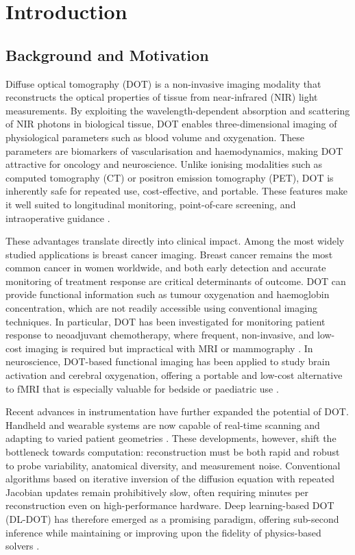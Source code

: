\chapter{Introduction}


\section{Background and Motivation}
Diffuse optical tomography (DOT) is a non-invasive imaging modality that reconstructs the optical properties of tissue from near-infrared (NIR) light measurements. By exploiting the wavelength-dependent absorption and scattering of NIR photons in biological tissue, DOT enables three-dimensional imaging of physiological parameters such as blood volume and oxygenation. These parameters are biomarkers of vascularisation and haemodynamics, making DOT attractive for oncology and neuroscience. Unlike ionising modalities such as computed tomography (CT) or positron emission tomography (PET), DOT is inherently safe for repeated use, cost-effective, and portable. These features make it well suited to longitudinal monitoring, point-of-care screening, and intraoperative guidance \cite{arridge1999, gibson2005}.

These advantages translate directly into clinical impact. Among the most widely studied applications is breast cancer imaging. Breast cancer remains the most common cancer in women worldwide, and both early detection and accurate monitoring of treatment response are critical determinants of outcome. DOT can provide functional information such as tumour oxygenation and haemoglobin concentration, which are not readily accessible using conventional imaging techniques. In particular, DOT has been investigated for monitoring patient response to neoadjuvant chemotherapy, where frequent, non-invasive, and low-cost imaging is required but impractical with MRI or mammography \cite{tromberg2016}. In neuroscience, DOT-based functional imaging has been applied to study brain activation and cerebral oxygenation, offering a portable and low-cost alternative to fMRI that is especially valuable for bedside or paediatric use \cite{eggebrecht2014}.

Recent advances in instrumentation have further expanded the potential of DOT. Handheld and wearable systems are now capable of real-time scanning and adapting to varied patient geometries \cite{stillwell2022}. These developments, however, shift the bottleneck towards computation: reconstruction must be both rapid and robust to probe variability, anatomical diversity, and measurement noise. Conventional algorithms based on iterative inversion of the diffusion equation with repeated Jacobian updates remain prohibitively slow, often requiring minutes per reconstruction even on high-performance hardware. Deep learning-based DOT (DL-DOT) has therefore emerged as a promising paradigm, offering sub-second inference while maintaining or improving upon the fidelity of physics-based solvers \cite{dale2024}.


